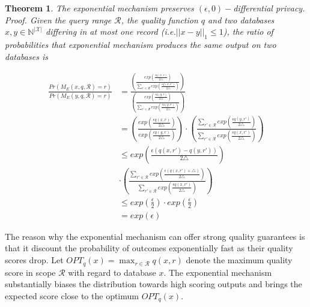 \documentclass[a4paper, 11pt]{article} %
\makeatletter
\DeclareRobustCommand{\ie}{i.e.\@\xspace}
\newtheorem{theorem}{Theorem}
\makeatother
\begin{document}
\begin{theorem}
The exponential mechanism preserves $(\epsilon, 0)-$differential privacy.
\textit{Proof. Given the query range $\mathcal{R}$, the quality function $q$ and two databases $x, y \in \mathbb{N}^{|\mathcal{X}|}$ differing in at most one record (\ie $||x-y||_1 \leq 1$), the ratio of probabilities that exponential mechanism produces the same output on two databases is }

\begin{align}
\frac{Pr(M_E(x, q, \mathcal{R})=r)}{Pr(M_E(y, q, \mathcal{R})=r)} &=
 \frac{
\left(
\frac{exp( \frac{\epsilon q(x,r) }{2 \triangle})}{\sum_{r' \in \mathcal{R}} exp( \frac{\epsilon q(x,r') }{2 \triangle})}
\right)
}
{
\left(
\frac{exp( \frac{\epsilon q(y,r) }{2 \triangle})}{\sum_{r' \in \mathcal{R}} exp( \frac{\epsilon q(y,r') }{2 \triangle})}
\right)
} \\
&=
\left(
\frac{exp( \frac{\epsilon q(x,r) }{2 \triangle})}
{exp( \frac{\epsilon q(y,r) }{2 \triangle})}
\right)
\cdot
\left(
\frac{\sum_{r' \in \mathcal{R}} exp( \frac{\epsilon q(y,r') }{2 \triangle})}{\sum_{r' \in \mathcal{R}} exp( \frac{\epsilon q(x,r') }{2 \triangle})}
\right) \\
& \leq exp \left(
\frac{\epsilon (q(x, r') - q(y, r') )}{2 \triangle}
\right) \\
& \cdot
\left(
\frac{\sum_{r' \in \mathcal{R}} exp( \frac{\epsilon (q(x,r')+\triangle) }{2 \triangle})}
{\sum_{r' \in \mathcal{R}} exp( \frac{\epsilon q(x,r') }{2 \triangle})}
\right) \\
& \leq exp(\frac{\epsilon}{2}) \cdot exp(\frac{\epsilon}{2})
 \\
&= exp(\epsilon)
\end{align}
\end{theorem}


The reason why the exponential mechanism can offer strong quality guarantees is that it discount the probability of outcomes exponentially fast as their quality scores drop. Let $OPT_q(x) = \max_{r \in \mathcal{R}} q(x, r)$ denote the maximum quality score in scope $\mathcal{R}$ with regard to database $x$. The exponential mechanism substantially biases the distribution towards high scoring outputs and brings the expected score close to the optimum $OPT_q(x)$.
\end{document}
